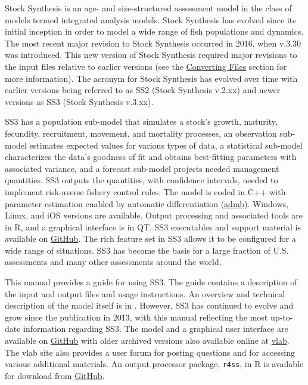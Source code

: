 Stock Synthesis is an age- and size-structured assessment model in the class of models termed integrated analysis models. Stock Synthesis has evolved since its initial inception in order to model a wide range of fish populations and dynamics. The most recent major revision to Stock Synthesis occurred in 2016, when v.3.30 was introduced. This new version of Stock Synthesis required major revisions to the input files relative to earlier versions (see the \hyperlink{ConvIssues}{Converting Files} section for more information). The acronym for Stock Synthesis has evolved over time with earlier versions being referred to as SS2 (Stock Synthesis v.2.xx) and newer versions as SS3 (Stock Synthesis v.3.xx). 

SS3 has a population sub-model that simulates a stock's growth, maturity, fecundity, recruitment, movement, and mortality processes, an observation sub-model estimates expected values for various types of data, a statistical sub-model characterizes the data's goodness of fit and obtains best-fitting parameters with associated variance, and a forecast sub-model projects needed management quantities. SS3 outputs the quantities, with confidence intervals, needed to implement risk-averse fishery control rules. The model is coded in C++ with parameter estimation enabled by automatic differentiation (\href{http://www.admb-project.org}{\gls{admb}}). Windows, Linux, and iOS versions are available. Output processing and associated tools are in R, and a graphical interface is in QT. SS3 executables and support material is available on \href{https://github.com/nmfs-ost}{GitHub}. The rich feature set in SS3 allows it to be configured for a wide range of situations. SS3 has become the basis for a large fraction of U.S. assessments and many other assessments around the world.  

This manual provides a guide for using SS3. The guide contains a description of the input and output files and usage instructions. An overview and technical description of the model itself is in \citet{methotstock2013}. However, SS3 has continued to evolve and grow since the publication in 2013, with this manual reflecting the most up-to-date information regarding SS3. The model and a graphical user interface are available on \href{https://github.com/nmfs-ost}{GitHub} with older archived versions also available online at \href{https://vlab.noaa.gov/web/stock-synthesis}{\gls{vlab}}. The \gls{vlab} site also provides a user forum for posting questions and for accessing various additional materials. An output processor package, \texttt{r4ss}, in R is available for download from \href{https://github.com/r4ss/r4ss}{GitHub}.

